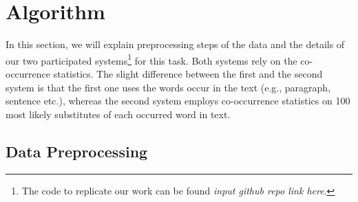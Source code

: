 \documentclass[11pt]{article}
\begin{document}
\begin{table*}[t]
\caption{Contexts when using a bigram language model}
\label{tab:subs_exp}
\end{table*}

\section{Algorithm}
\label{algorithm}
In this section, we will explain preprocessing steps of the data and the details of our two participated systems\footnote{The code to replicate our work can be found \emph{input github repo link here}.} for this task. Both systems rely on the co-occurrence statistics. The slight difference between the first and the second system is that the first one uses the words occur in the text (e.g., paragraph, sentence etc.), whereas the second system employs co-occurrence statistics on 100 most likely substitutes of each occurred word in text. 

\subsection{Data Preprocessing}
\end{document}
